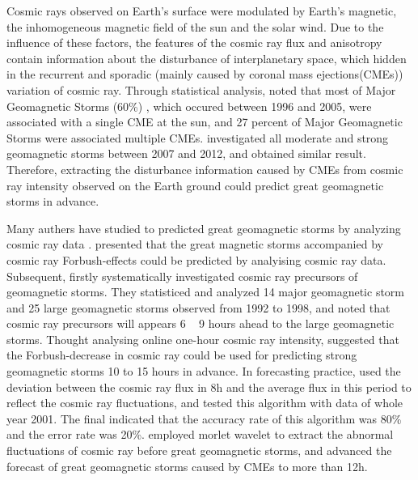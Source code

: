 \documentclass[draft]{agujournal2019}
\begin{document}
Cosmic rays observed on Earth's surface were modulated by  Earth's magnetic, the inhomogeneous magnetic field of the sun and the solar wind\cite{MANDRIKOVA2018116,Kravtsova2016Cosmic}. Due to the influence of these factors, the features of the cosmic ray flux and anisotropy contain information about the disturbance of  interplanetary space\cite{Belov2003Cosmic,Kichigin2017}, which hidden in the recurrent  and sporadic (mainly caused by coronal mass ejections(CMEs)) variation of cosmic ray. Through statistical analysis,  noted that most of Major Geomagnetic Storms (60\%) , which occured between 1996 and 2005, were associated with a single CME at the sun, and 27 percent of  Major Geomagnetic Storms were associated multiple CMEs.  investigated  all moderate and strong geomagnetic storms between 2007 and 2012, and obtained similar result. Therefore, extracting the disturbance information caused by CMEs from cosmic ray intensity observed on the Earth ground could predict great geomagnetic storms in advance. 

Many authers have studied to predicted  great geomagnetic storms by analyzing cosmic ray data \cite{Dorman1999Cosmic,Munakata2000Precursors,Kudela2001On,angeo-23-2997-2005,Xue2007Preliminary,zhu2015}.  presented  that the great magnetic storms accompanied by cosmic ray Forbush-effects could be predicted by analyising cosmic ray data. Subsequent, firstly systematically investigated cosmic ray precursors of geomagnetic storms. They statisticed and analyzed 14 major geomagnetic storm and 25 large geomagnetic storms observed from 1992 to 1998,  and noted that cosmic ray precursors will appears 6 ~ 9 hours ahead to the large geomagnetic storms. Thought analysing online one-hour cosmic ray intensity,  suggested that the Forbush-decrease in cosmic ray could be used for  predicting  strong geomagnetic storms 10 to 15 hours in advance.  In  forecasting practice,  used  the deviation between the cosmic ray flux in 8h and the average flux in this period to reflect the cosmic ray fluctuations, and tested this algorithm with data of whole year 2001. The final indicated that  the accuracy rate of this algorithm was 80\% and the error rate was 20\%.   employed morlet wavelet to extract the abnormal fluctuations of cosmic ray before great geomagnetic storms, and advanced the forecast of great  geomagnetic storms caused by CMEs to more than 12h.
\end{document}
